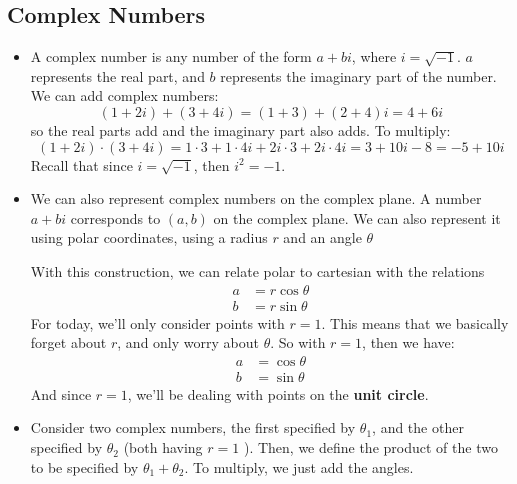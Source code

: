\subsection{Complex Numbers}
\begin{itemize}
	\item A complex number is any number of the form \( a + bi \), where \( i = \sqrt{-1}  \). \( a \) represents the real part, and 
		\( b \) represents the imaginary part of the number. We can add complex numbers:
		\[
			(1 + 2i) + (3 + 4i) = (1 + 3) + (2 + 4)i = 4 + 6i
		\] 
		so the real parts add and the imaginary part also adds. To multiply:
		\[
			(1 + 2i) \cdot (3 + 4i) = 1 \cdot 3 + 1 \cdot 4i + 2i \cdot 3 + 2i \cdot 4i = 3 + 10i - 8 = -5 + 10i
		\] 
		Recall that since \( i = \sqrt{-1}  \), then  \( i^2 = -1 \). 
	\item We can also represent complex numbers on the complex plane. A number \( a + bi \) corresponds to  \( (a, b) \) on the 
		complex plane. We can also represent it using polar coordinates, using a radius \( r \) and an angle \( \theta \)
		\begin{center}
		\end{center}
		With this construction, we can relate polar to cartesian with the relations
		\begin{align*}
			a &= r\cos\theta \\
			b&= r \sin \theta 
		\end{align*}
		For today, we'll only consider points with \( r = 1 \). This means that we basically forget about \( r \), and only 
		worry about \( \theta \). So with \( r = 1 \), then we have:
		\begin{align*}
			a &=  \cos \theta \\
			b &=  \sin \theta 
		\end{align*}
		And since \( r = 1 \), we'll be dealing with points on the \textbf{unit circle}.
	\item Consider two complex numbers, the first specified by \( \theta_1 \), and the other specified by \( \theta_2 \) (both 
		having \( r = 1 \) ). Then, we define the product of the two to be specified by \( \theta_1 + \theta_2 \). To multiply, 
		we just add the angles.
\end{itemize}
